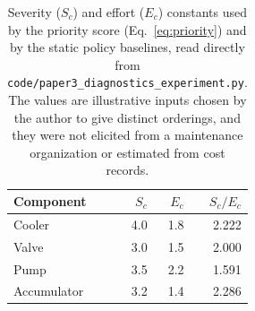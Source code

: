 \begin{table}[t]
\centering
\caption{Severity ($S_c$) and effort ($E_c$) constants used by the priority score (Eq.~\ref{eq:priority}) and by the static policy baselines, read directly from \texttt{code/paper3\_diagnostics\_experiment.py}. The values are illustrative inputs chosen by the author to give distinct orderings, and they were not elicited from a maintenance organization or estimated from cost records.}
\label{tab:constants}
\footnotesize
\begin{tabular}{lrrr}
\hline
Component & $S_c$ & $E_c$ & $S_c/E_c$ \\
\hline
Cooler & 4.0 & 1.8 & 2.222 \\
Valve & 3.0 & 1.5 & 2.000 \\
Pump & 3.5 & 2.2 & 1.591 \\
Accumulator & 3.2 & 1.4 & 2.286 \\
\hline
\end{tabular}
\end{table}
